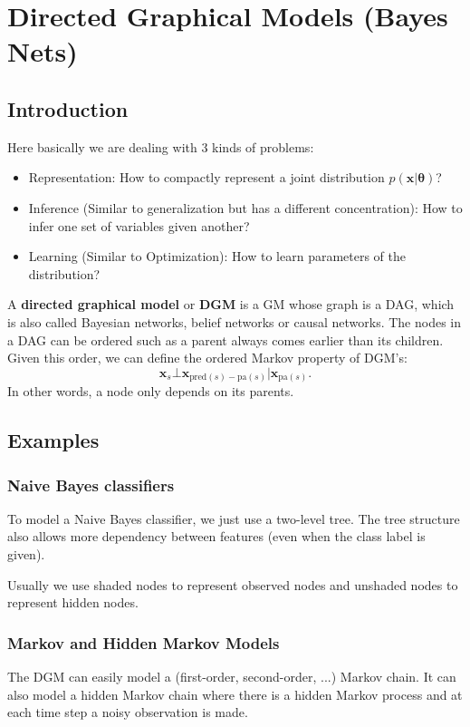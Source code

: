 \documentclass[openany]{book}
\begin{document}
\setcounter{chapter}{9}

\chapter{Directed Graphical Models (Bayes Nets)}
\section{Introduction}
Here basically we are dealing with 3 kinds of problems:
\begin{itemize}
\item Representation: How to compactly represent a joint distribution $p(\mathbf{x}|\boldsymbol{\theta})$?
\item Inference (Similar to generalization but has a different concentration): How to infer one set of variables given another?
\item Learning (Similar to Optimization): How to learn parameters of the distribution?
\end{itemize}

A \textbf{directed graphical model} or \textbf{DGM} is a GM whose graph is a DAG, which is also called Bayesian networks, belief networks or causal networks. The nodes in a DAG can be ordered such as a parent always comes earlier than its children. Given this order, we can define the ordered Markov property of DGM's:
\begin{equation}
\mathbf{x}_s\bot\mathbf{x}_{\mathrm{pred}(s)-\mathrm{pa}(s)}|\mathbf{x}_{\mathrm{pa}(s)}.
\end{equation}
In other words, a node only depends on its parents.

\section{Examples}
\subsection{Naive Bayes classifiers}
To model a Naive Bayes classifier, we just use a two-level tree. The tree structure also allows more dependency between features (even when the class label is given).

Usually we use shaded nodes to represent observed nodes and unshaded nodes to represent hidden nodes.

\subsection{Markov and Hidden Markov Models}
The DGM can easily model a (first-order, second-order, ...) Markov chain. It can also model a hidden Markov chain where there is a hidden Markov process and at each time step a noisy observation is made.
\end{document}
